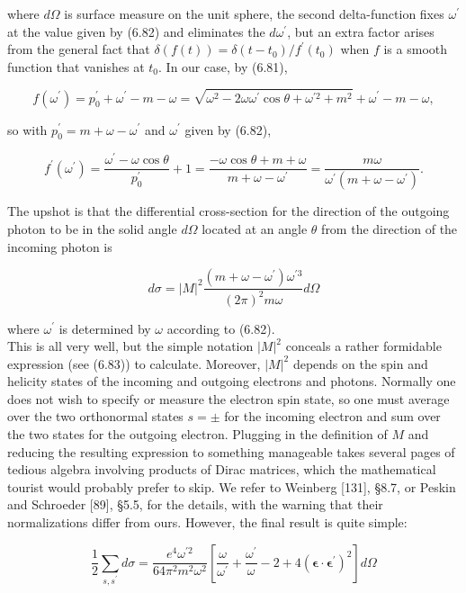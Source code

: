 \documentclass[10pt, letterpaper]{article}
\begin{document}
where $d \Omega$ is surface measure on the unit sphere, the second delta-function fixes $\omega^{\prime}$ at the value given by (6.82) and eliminates the $d \omega^{\prime}$, but an extra factor arises from the general fact that $\delta(f(t))=\delta\left(t-t_{0}\right) / f^{\prime}\left(t_{0}\right)$ when $f$ is a smooth function that vanishes at $t_{0}$. In our case, by (6.81),

$$
f\left(\omega^{\prime}\right)=p_{0}^{\prime}+\omega^{\prime}-m-\omega=\sqrt{\omega^{2}-2 \omega \omega^{\prime} \cos \theta+\omega^{\prime 2}+m^{2}}+\omega^{\prime}-m-\omega,
$$

so with $p_{0}^{\prime}=m+\omega-\omega^{\prime}$ and $\omega^{\prime}$ given by (6.82),

$$
f^{\prime}\left(\omega^{\prime}\right)=\frac{\omega^{\prime}-\omega \cos \theta}{p_{0}^{\prime}}+1=\frac{-\omega \cos \theta+m+\omega}{m+\omega-\omega^{\prime}}=\frac{m \omega}{\omega^{\prime}\left(m+\omega-\omega^{\prime}\right)} .
$$

The upshot is that the differential cross-section for the direction of the outgoing photon to be in the solid angle $d \Omega$ located at an angle $\theta$ from the direction of the incoming photon is

$$
d \sigma=|M|^{2} \frac{\left(m+\omega-\omega^{\prime}\right) \omega^{\prime 3}}{(2 \pi)^{2} m \omega} d \Omega
$$

where $\omega^{\prime}$ is determined by $\omega$ according to (6.82).\\
This is all very well, but the simple notation $|M|^{2}$ conceals a rather formidable expression (see (6.83)) to calculate. Moreover, $|M|^{2}$ depends on the spin and helicity states of the incoming and outgoing electrons and photons. Normally one does not wish to specify or measure the electron spin state, so one must average over the two orthonormal states $s= \pm$ for the incoming electron and sum over the two states for the outgoing electron. Plugging in the definition of $M$ and reducing the resulting expression to something manageable takes several pages of tedious algebra involving products of Dirac matrices, which the mathematical tourist would probably prefer to skip. We refer to Weinberg [131], §8.7, or Peskin and Schroeder [89], §5.5, for the details, with the warning that their normalizations differ from ours. However, the final result is quite simple:

$$
\frac{1}{2} \sum_{s, s^{\prime}} d \sigma=\frac{e^{4} \omega^{\prime 2}}{64 \pi^{2} m^{2} \omega^{2}}\left[\frac{\omega}{\omega^{\prime}}+\frac{\omega^{\prime}}{\omega}-2+4\left(\boldsymbol{\epsilon} \cdot \boldsymbol{\epsilon}^{\prime}\right)^{2}\right] d \Omega
$$
\end{document}
